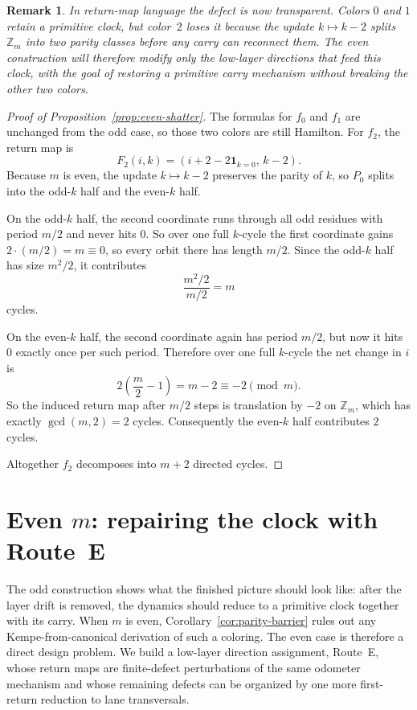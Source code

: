 \documentclass[11pt]{article}
\newtheorem{remark}{Remark}
\begin{document}
\begin{remark}
In return-map language the defect is now transparent.
Colors $0$ and $1$ retain a primitive clock, but color~$2$ loses it because the update $k\mapsto k-2$ splits $\mathbb Z_m$ into two parity classes before any carry can reconnect them.
The even construction will therefore modify only the low-layer directions that feed this clock, with the goal of restoring a primitive carry mechanism without breaking the other two colors.
\end{remark}

\begin{proof}[Proof of Proposition~\ref{prop:even-shatter}]
The formulas for $f_0$ and $f_1$ are unchanged from the odd case, so those two colors are still Hamilton.
For $f_2$, the return map is
\[
F_2(i,k)=(i+2-2\mathbf 1_{k=0},\,k-2).
\]
Because $m$ is even, the update $k\mapsto k-2$ preserves the parity of $k$, so $P_0$ splits into the odd-$k$ half and the even-$k$ half.

On the odd-$k$ half, the second coordinate runs through all odd residues with period $m/2$ and never hits $0$.
So over one full $k$-cycle the first coordinate gains $2\cdot(m/2)=m\equiv 0$, so every orbit there has length $m/2$.
Since the odd-$k$ half has size $m^2/2$, it contributes
\[
\frac{m^2/2}{m/2}=m
\]
cycles.

On the even-$k$ half, the second coordinate again has period $m/2$, but now it hits $0$ exactly once per such period.
Therefore over one full $k$-cycle the net change in $i$ is
\[
2\left(\frac m2-1\right)=m-2\equiv -2 \pmod m.
\]
So the induced return map after $m/2$ steps is translation by $-2$ on $\mathbb Z_m$, which has exactly $\gcd(m,2)=2$ cycles.
Consequently the even-$k$ half contributes $2$ cycles.

Altogether $f_2$ decomposes into $m+2$ directed cycles.
\end{proof}


\section{Even $m$: repairing the clock with Route~E}\label{sec:even}

The odd construction shows what the finished picture should look like: after the layer drift is removed, the dynamics should reduce to a primitive clock together with its carry.
When $m$ is even, Corollary~\ref{cor:parity-barrier} rules out any Kempe-from-canonical derivation of such a coloring.
The even case is therefore a direct design problem.
We build a low-layer direction assignment, Route~E, whose return maps are finite-defect perturbations of the same odometer mechanism and whose remaining defects can be organized by one more first-return reduction to lane transversals.
\end{document}
